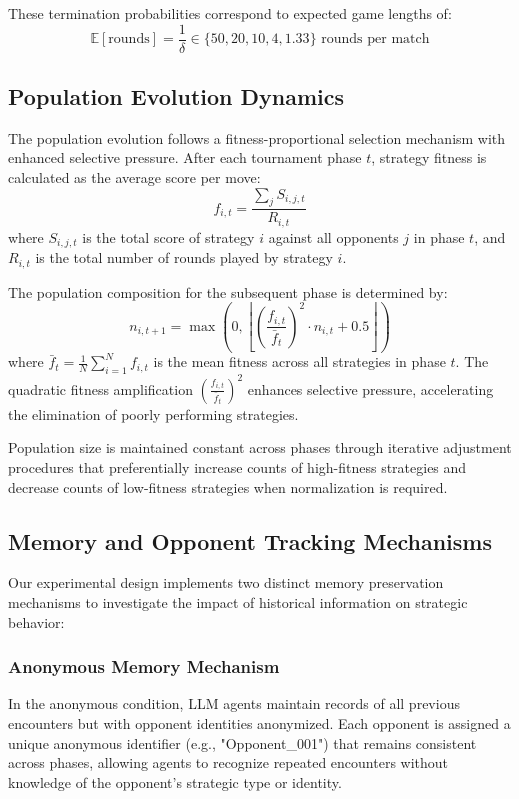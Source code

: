These termination probabilities correspond to expected game lengths of:
\[
\mathbb{E}[\text{rounds}] = \frac{1}{\delta} \in \{50, 20, 10, 4, 1.33\} \text{ rounds per match}
\]

\subsection{Population Evolution Dynamics}

The population evolution follows a fitness-proportional selection mechanism with enhanced selective pressure. After each tournament phase $t$, strategy fitness is calculated as the average score per move:
\[
f_{i,t} = \frac{\sum_{j} S_{i,j,t}}{R_{i,t}}
\]
where $S_{i,j,t}$ is the total score of strategy $i$ against all opponents $j$ in phase $t$, and $R_{i,t}$ is the total number of rounds played by strategy $i$.

The population composition for the subsequent phase is determined by:
\[
n_{i,t+1} = \max\left(0, \left\lfloor \left(\frac{f_{i,t}}{\bar{f}_t}\right)^2 \cdot n_{i,t} + 0.5 \right\rfloor\right)
\]
where $\bar{f}_t = \frac{1}{N}\sum_{i=1}^{N} f_{i,t}$ is the mean fitness across all strategies in phase $t$. The quadratic fitness amplification $\left(\frac{f_{i,t}}{\bar{f}_t}\right)^2$ enhances selective pressure, accelerating the elimination of poorly performing strategies.

Population size is maintained constant across phases through iterative adjustment procedures that preferentially increase counts of high-fitness strategies and decrease counts of low-fitness strategies when normalization is required.

\subsection{Memory and Opponent Tracking Mechanisms}

Our experimental design implements two distinct memory preservation mechanisms to investigate the impact of historical information on strategic behavior:

\subsubsection{Anonymous Memory Mechanism}
In the anonymous condition, LLM agents maintain records of all previous encounters but with opponent identities anonymized. Each opponent is assigned a unique anonymous identifier (e.g., "Opponent\_001") that remains consistent across phases, allowing agents to recognize repeated encounters without knowledge of the opponent's strategic type or identity.

